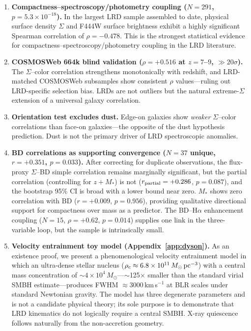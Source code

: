 \documentclass[twocolumn,linenumbers]{aastex631}
\begin{document}
\begin{enumerate}
\item \textbf{Compactness--spectroscopy/photometry coupling ($N=291$, $p = 5.3 \times 10^{-18}$).} In the largest LRD sample assembled to date, physical surface density $\Sigma$ and F444W surface brightness exhibit a highly significant Spearman correlation of $\rho = -0.478$. This is the strongest statistical evidence for compactness--spectroscopy/photometry coupling in the LRD literature.

\item \textbf{COSMOSWeb 664k blind validation ($\rho = +0.516$ at $z=7$--$9$, ${\gg}20\sigma$).} The $\Sigma$--color correlation strengthens monotonically with redshift, and LRD-matched COSMOSWeb subsamples show consistent $\rho$ values---ruling out LRD-specific selection bias. LRDs are not outliers but the natural extreme-$\Sigma$ extension of a universal galaxy correlation.

\item \textbf{Orientation test excludes dust.} Edge-on galaxies show \textit{weaker} $\Sigma$--color correlations than face-on galaxies---the opposite of the dust hypothesis prediction. Dust is not the primary driver of LRD spectroscopic anomalies.

\item \textbf{BD correlations as supporting convergence ($N=37$ unique, $r = +0.351$, $p = 0.033$).} After correcting for duplicate observations, the flux-proxy $\Sigma$--BD simple correlation remains marginally significant, but the partial correlation (controlling for $z + M_*$) is not ($r_{\rm partial} = +0.286$, $p = 0.087$), and the bootstrap 95\% CI is broad with a lower bound near zero. $M_*$ shows zero correlation with BD ($r = +0.009$, $p = 0.956$), providing qualitative directional support for compactness over mass as a predictor. The BD--H$\alpha$ enhancement coupling ($N=15$, $\rho = +0.62$, $p = 0.014$) supplies one link in the three-variable loop, but the sample is intrinsically small.

\item \textbf{Velocity entrainment toy model (Appendix~\ref{app:dyson}).} As an existence proof, we present a phenomenological velocity entrainment model in which an ultra-dense stellar nucleus ($\rho_c \approx 6.8 \times 10^{11}\,M_\odot\,{\rm pc}^{-3}$) with a central mass concentration of $\sim$$4 \times 10^4\,M_\odot$---$\sim$125$\times$ smaller than the standard virial SMBH estimate---produces FWHM $\approx 3000$\,km\,s$^{-1}$ at BLR scales under standard Newtonian gravity. The model has three degenerate parameters and is not a candidate physical theory; its sole purpose is to demonstrate that LRD kinematics do not logically require a central SMBH. X-ray quiescence follows naturally from the non-accretion geometry.


\end{enumerate}
\end{document}
